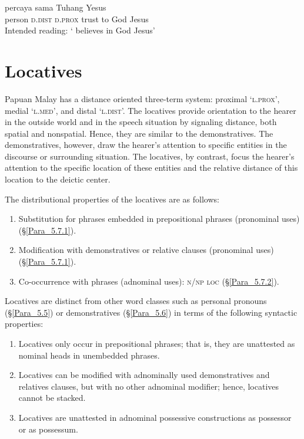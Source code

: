 \ea
\label{Example_5.221}
\gll {*} {} {} {} {percaya} {sama} {Tuhang} {Yesus}\\ %
 { }   person  \textsc{d.dist}  \textsc{d.prox}  trust  to  God  Jesus\\
\glt
Intended reading: ‘ believes in God Jesus’ \textstyleExampleSource{[Elicited BR111017.010]}
\z


\section{Locatives}
\label{Para_5.7}
Papuan Malay has a distance oriented three-term  system: proximal  ‘\textsc{l.prox}’, medial  ‘\textsc{l.med}’, and distal  ‘\textsc{l.dist}’. The locatives provide orientation to the hearer in the outside world and in the speech situation by signaling distance, both spatial and nonspatial. Hence, they are similar to the demonstratives. The demonstratives, however, draw the hearer’s attention to specific entities in the discourse or surrounding situation. The locatives, by contrast, focus the hearer’s attention to the specific location of these entities and the relative distance of this location to the deictic center.



The distributional properties of the locatives are as follows:



\begin{enumerate}
\item 
Substitution for  phrases embedded in prepositional phrases (pronominal uses) (§\ref{Para_5.7.1}).
\item 
Modification with demonstratives or relative clauses (pronominal uses) (§\ref{Para_5.7.1}).
\item 
Co-occurrence with  phrases (adnominal uses): \textsc{n}/\textsc{np} \textsc{loc} (§\ref{Para_5.7.2}).

\end{enumerate}

Locatives are distinct from other word classes such as personal pronouns (§\ref{Para_5.5}) or demonstratives (§\ref{Para_5.6}) in terms of the following syntactic properties:


\begin{enumerate}
\item 
Locatives  only occur in prepositional phrases; that is, they are unattested as nominal heads in unembedded  phrases.
\item 
Locatives can be modified with adnominally used demonstratives and relatives clauses, but with no other adnominal modifier; hence, locatives cannot be stacked.
\item 
Locatives are unattested in adnominal possessive constructions as possessor or as possessum.

\end{enumerate}

